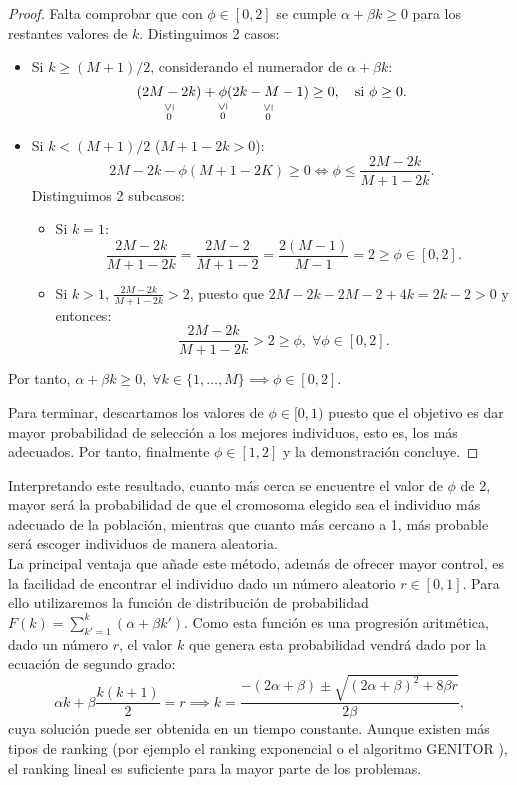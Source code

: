 \begin{proposition}
\begin{proof}
        Falta comprobar que con $\phi\in[0,2]$ se cumple $\alpha+\beta k\geq0$ para los restantes valores de $k$. Distinguimos 2 casos:

        \begin{itemize}
            \item Si $k\geq(M+1)/2$, considerando el numerador de $\alpha+\beta k$:
            \[
            \underset{\overset{\scriptsize \rotatebox[origin=c]{90}{$\leq$}}{0}}{(2M - 2k)} 
            + \underset{\overset{\scriptsize \rotatebox[origin=c]{90}{$\leq$}}{0}}{\phi}\underset{\overset{\scriptsize \rotatebox[origin=c]{90}{$\leq$}}{0}}{(2k - M - 1)} 
            \geq 0, \quad \text{si } \phi \geq 0.
            \]
            \item Si $k<(M+1)/2$ ($M+1-2k>0$):
            $$2M-2k-\phi(M+1-2K)\geq 0 \iff \phi\leq\frac{2M-2k}{M+1-2k}.$$
            Distinguimos 2 subcasos:
            \begin{itemize}
                \item Si $k=1$: $$\frac{2M-2k}{M+1-2k}=\frac{2M-2}{M+1-2}=\frac{2(M-1)}{M-1}=2\geq\phi\in[0,2].$$
                \item Si $k>1$, $\frac{2M-2k}{M+1-2k}>2$, puesto que $2M-2k-2M-2+4k=2k-2>0$ y entonces:
                $$\frac{2M-2k}{M+1-2k}>2\geq\phi,\;\forall\phi\in[0,2].$$
            \end{itemize}
        \end{itemize}
        
        Por tanto, $\alpha+\beta k \geq 0,\;\forall k\in\{1,\ldots,M\}\implies \phi\in[0,2]$.
        
        Para terminar, descartamos los valores de $\phi\in[0,1)$ puesto que el objetivo es dar mayor probabilidad de selección a los mejores individuos, esto es, los más adecuados. Por tanto, finalmente $\phi\in[1,2]$ y la demonstración concluye.
    \end{proof}
\end{proposition}

Interpretando este resultado, cuanto más cerca se encuentre el valor de $\phi$ de 2, mayor será la probabilidad de que el cromosoma elegido sea el individuo más adecuado de la población, mientras que cuanto más cercano a 1, más probable será escoger individuos de manera aleatoria.\\

La principal ventaja que añade este método, además de ofrecer mayor control, es la facilidad de encontrar el individuo dado un número aleatorio $r\in[0,1]$. Para ello utilizaremos la función de distribución de probabilidad $F(k)=\sum_{k'=1}^k(\alpha+\beta k')$. Como esta función es una progresión aritmética, dado un número $r$, el valor $k$ que genera esta probabilidad vendrá dado por la ecuación de segundo grado:
$$\alpha k+\beta\frac{k(k+1)}{2}=r\implies k = \frac{-(2\alpha+\beta)\pm \sqrt{(2\alpha+\beta)^2+8\beta r}}{2\beta},$$
cuya solución puede ser obtenida en un tiempo constante. Aunque existen más tipos de ranking (por ejemplo el ranking exponencial \cite{exponential-ranking} o el algoritmo GENITOR \cite{genitor}), el ranking lineal es suficiente para la mayor parte de los problemas.

